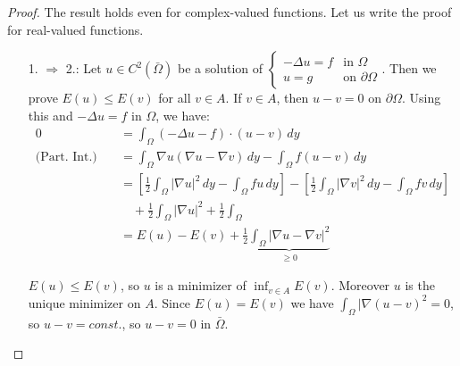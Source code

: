 \documentclass{report}
\theoremstyle{tommy}
\begin{document}
  \begin{proof}
    The result holds even for complex-valued functions. Let us write the proof for real-valued functions.
    \begin{itemize}
      \item[1. \(\Rightarrow\) 2.:] Let \(u \in C^2(\bar \Omega)\) be a solution of \(\begin{cases}
        - \Delta u = f &\text{in } \Omega \\ u = g &\text{on } \partial \Omega
      \end{cases}\). Then we prove \(E(u) \le E(v)\) for all \(v \in A\). If \(v \in A\), then \(u - v = 0\) on \(\partial \Omega\). Using this and \(-\Delta u = f\) in \(\Omega\), we have:
      \begin{align*}
        0 
        &= \int_\Omega (-\Delta u - f)\cdot(u-v) \, dy  \\
        \text{(Part. Int.)} \quad &= \int_\Omega \nabla u (\nabla u - \nabla v) \, dy - \int_\Omega f (u-v) \, dy \\
        &= \left[\frac{1}{2} \int_\Omega |\nabla u|^2 \, dy - \int_\Omega fu \, dy\right] - \left[\frac{1}{2} \int_\Omega |\nabla v|^2 \, dy - \int_\Omega f v \, dy\right] \\
        &\quad+ \frac{1}{2} \int_\Omega |\nabla u|^2 + \frac{1}{2} \int_\Omega  \\
        &= E(u) - E(v) + \frac{1}{2} \underbrace{\int_\Omega |\nabla u - \nabla v|^2}_{\ge 0}
      \end{align*}
    
      \(E(u) \le E(v)\), so \(u\) is a minimizer of \(\inf_{v \in A} E(v)\). Moreover \(u\) is the unique minimizer on \(A\). Since \(E(u) = E(v)\) we have \(\int_\Omega|\nabla (u-v)^2 = 0\), so \(u-v = const.\), so \(u-v = 0\) in \(\bar \Omega\).


\end{itemize}
\end{proof}
\end{document}
